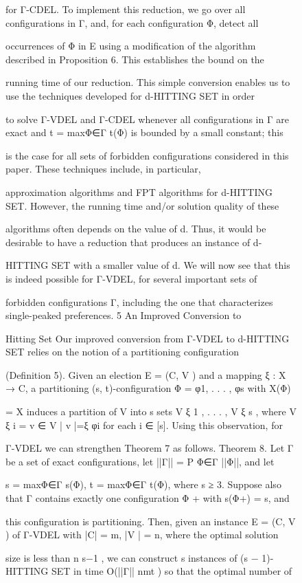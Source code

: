 \documentclass[12pt, a4paper]{report}
\begin{document}
\begin{figure}[ht!]
for Γ-CDEL. To implement this reduction, we go over all configurations in Γ, and, for each configuration Φ, detect all 

occurrences of Φ in E using a modification of the algorithm described in Proposition 6. This establishes the bound on the 

running time of our reduction. This simple conversion enables us to use the techniques developed for d-HITTING SET in order 

to solve Γ-VDEL and Γ-CDEL whenever all configurations in Γ are exact and t = maxΦ∈Γ t(Φ) is bounded by a small constant; this 

is the case for all sets of forbidden configurations considered in this paper. These techniques include, in particular, 

approximation algorithms and FPT algorithms for d-HITTING SET. However, the running time and/or solution quality of these 

algorithms often depends on the value of d. Thus, it would be desirable to have a reduction that produces an instance of d-

HITTING SET with a smaller value of d. We will now see that this is indeed possible for Γ-VDEL, for several important sets of 

forbidden configurations Γ, including the one that characterizes single-peaked preferences. 5 An Improved Conversion to 

Hitting Set Our improved conversion from Γ-VDEL to d-HITTING SET relies on the notion of a partitioning configuration 

(Definition 5). Given an election E = (C, V ) and a mapping ξ : X → C, a partitioning (s, t)-configuration Φ = {φ1, . . . , φs} with X(Φ) 

= X induces a partition of V into s sets V ξ 1 , . . . , V ξ s , where V ξ i = {v ∈ V | v |=ξ φi} for each i ∈ [s]. Using this observation, for 

Γ-VDEL we can strengthen Theorem 7 as follows. Theorem 8. Let Γ be a set of exact configurations, let ||Γ|| = P Φ∈Γ ||Φ||, and let 

s = maxΦ∈Γ s(Φ), t = maxΦ∈Γ t(Φ), where s ≥ 3. Suppose also that Γ contains exactly one configuration Φ + with s(Φ+) = s, and 

this configuration is partitioning. Then, given an instance E = (C, V ) of Γ-VDEL with |C| = m, |V | = n, where the optimal solution 

size is less than n s−1 , we can construct s instances of (s − 1)-HITTING SET in time O(||Γ|| nmt ) so that the optimal number of 


\end{figure}
\end{document}
